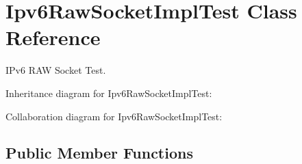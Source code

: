 \hypertarget{classIpv6RawSocketImplTest}{}\section{Ipv6\+Raw\+Socket\+Impl\+Test Class Reference}
\label{classIpv6RawSocketImplTest}


I\+Pv6 R\+AW Socket Test.  




Inheritance diagram for Ipv6\+Raw\+Socket\+Impl\+Test\+:


Collaboration diagram for Ipv6\+Raw\+Socket\+Impl\+Test\+:
\subsection*{Public Member Functions}
